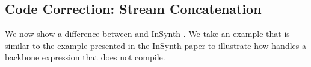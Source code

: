 %
%
%
%

\subsection{Code Correction: Stream Concatenation}

We now show a difference between \ourTool and InSynth \cite{GveroETAL13CompleteCompletionTypesWeights}. We take an example that is similar to the example presented in the InSynth paper to illustrate how \ourTool handles a backbone expression that does not compile. 

